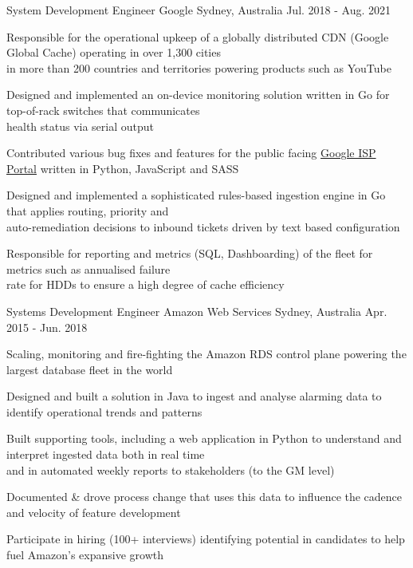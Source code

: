 \begin{cventries}
  \cventry
    {System Development Engineer} %
    {Google} %
    {Sydney, Australia} %
    {Jul. 2018 - Aug. 2021} %
    {
      \begin{cvitems} %
        \item {Responsible for the operational upkeep of a globally distributed CDN (Google Global Cache) operating in over 1,300 cities\\
         in more than 200 countries and territories powering products such as YouTube}
        \item {Designed and implemented an on-device monitoring solution written in Go for top-of-rack switches that communicates\\
         health status via serial output }
        \item {Contributed various bug fixes and features for the public facing \href{https://peering.google.com/}{Google ISP Portal} written in Python, JavaScript and SASS}
        \item {Designed and implemented a sophisticated rules-based ingestion engine in Go that applies routing, priority and\\
         auto-remediation decisions to inbound tickets driven by text based configuration}
        \item {Responsible for reporting and metrics (SQL, Dashboarding) of the fleet for metrics such as annualised failure\\
         rate for HDDs to ensure a high degree of cache efficiency}
      \end{cvitems}
    }


  \cventry
    {Systems Development Engineer} %
    {Amazon Web Services} %
    {Sydney, Australia} %
    {Apr. 2015 - Jun. 2018} %
    {
      \begin{cvitems} %
        \item {Scaling, monitoring and fire-fighting the Amazon RDS control plane powering the largest database fleet in the world}
        \item {Designed and built a solution in Java to ingest and analyse alarming data to identify operational trends and patterns }
        \item {Built supporting tools, including a web application in Python to understand and interpret ingested data both in real time\\
        and in automated weekly reports to stakeholders (to the GM level)}
        \item {Documented \& drove process change that uses this data to influence the cadence and velocity of feature development }
        \item {Participate in hiring (100+ interviews) identifying potential in candidates to help fuel Amazon's expansive growth}
      \end{cvitems}
    }


\end{cventries}
